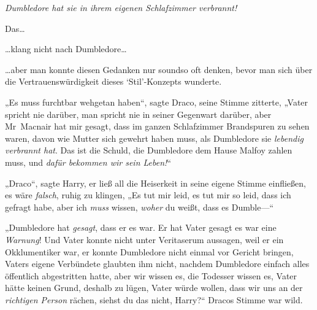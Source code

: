 \emph{Dumbledore hat sie in ihrem eigenen Schlafzimmer verbrannt!}

Das…

…klang nicht nach Dumbledore…

…aber man konnte diesen Gedanken nur soundso oft denken, bevor man sich über die Vertrauenswürdigkeit dieses `Stil'-Konzepts wunderte.

„Es muss furchtbar wehgetan haben“, sagte Draco, seine Stimme zitterte, „Vater spricht nie darüber, man spricht nie in seiner Gegenwart darüber, aber Mr~Macnair hat mir gesagt, dass im ganzen Schlafzimmer Brandspuren zu sehen waren, davon wie Mutter sich gewehrt haben muss, als Dumbledore sie \emph{lebendig verbrannt hat}. Das ist die Schuld, die Dumbledore dem Hause Malfoy zahlen muss, und \emph{dafür bekommen wir sein Leben!}“

„Draco“, sagte Harry, er ließ all die Heiserkeit in seine eigene Stimme einfließen, es wäre \emph{falsch}, ruhig zu klingen, „Es tut mir leid, es tut mir so leid, dass ich gefragt habe, aber ich \emph{muss} wissen, \emph{woher} du weißt, dass es Dumble—“

„Dumbledore hat \emph{gesagt}, dass er es war. Er hat Vater gesagt es war eine \emph{Warnung}! Und Vater konnte nicht unter Veritaserum aussagen, weil er ein Okklumentiker war, er konnte Dumbledore nicht einmal vor Gericht bringen, Vaters eigene Verbündete glaubten ihm nicht, nachdem Dumbledore einfach alles öffentlich abgestritten hatte, aber wir wissen es, die Todesser wissen es, Vater hätte keinen Grund, deshalb zu lügen, Vater würde wollen, dass wir uns an der \emph{richtigen Person} rächen, siehst du das nicht, Harry?“ Dracos Stimme war wild.


